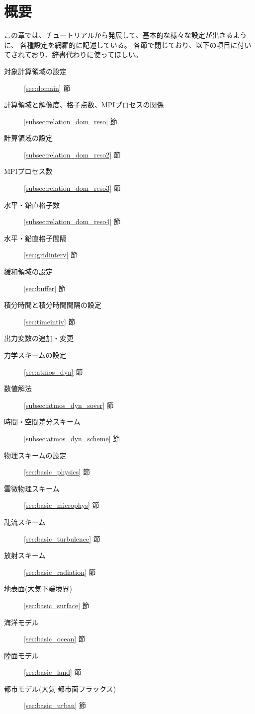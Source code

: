 \section{概要} \label{sec:basic_intro}

この章では、チュートリアルから発展して、基本的な様々な設定が出きるように、
各種設定を網羅的に記述している。
各節で閉じており、以下の項目に付いてされており、辞書代わりに使ってほしい。

{\small
\begin{description}
\item[対象計算領域の設定] \ref{sec:domain} 節
\item[計算領域と解像度、格子点数、MPIプロセスの関係] \ref{subsec:relation_dom_reso} 節
\item[計算領域の設定] \ref{subsec:relation_dom_reso2} 節
\item[MPIプロセス数] \ref{subsec:relation_dom_reso3} 節
\item[水平・鉛直格子数] \ref{subsec:relation_dom_reso4} 節
\item[水平・鉛直格子間隔] \ref{sec:gridinterv} 節
\item[緩和領域の設定] \ref{sec:buffer} 節
\item[積分時間と積分時間間隔の設定] \ref{sec:timeintiv} 節
\item[出力変数の追加・変更] \label{sec:output}
\item[力学スキームの設定] \ref{sec:atmos_dyn} 節
\item[数値解法]  \ref{subsec:atmos_dyn_sover} 節
\item[時間・空間差分スキーム] \ref{subsec:atmos_dyn_scheme} 節
\item[物理スキームの設定] \ref{sec:basic_physics} 節
\item[雲微物理スキーム] \ref{sec:basic_microphys} 節
\item[乱流スキーム] \ref{sec:basic_turbulence} 節
\item[放射スキーム] \ref{sec:basic_radiation} 節
\item[地表面(大気下端境界)] \ref{sec:basic_surface} 節
\item[海洋モデル] \ref{sec:basic_ocean} 節
\item[陸面モデル] \ref{sec:basic_land} 節
\item[都市モデル(大気-都市面フラックス)] \ref{sec:basic_urban} 節
\end{description}
}
